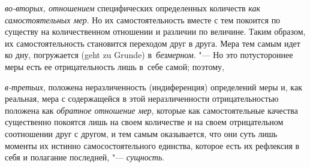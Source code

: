 {\em во-вторых, отношением} специфических определенных количеств
{\em как самостоятельных мер}. Но их самостоятельность вместе с тем покоится по
существу на количественном отношении и различии по величине. Таким образом, их
самостоятельность становится переходом друг в друга. Мера тем самым идет ко
дну, погружается (geht zu Grunde) в~{\em безмерном}. "--- Но это потустороннее
меры есть ее отрицательность лишь в~себе самой; поэтому,

{\em в-третьих}, положена неразличенность (индиференция) определений меры и,
как реальная, мера с содержащейся в этой неразличенности отрицательностью
положена как {\em обратное отношение мер}, которые как самостоятельные качества
существенно покоятся лишь на своем количестве и на своем отрицательном
соотношении друг с другом, и тем самым оказывается, что они суть лишь моменты
их истинно самосостоятельного единства, которое есть их рефлексия в себя и
полагание последней, "--- {\em сущность}.

